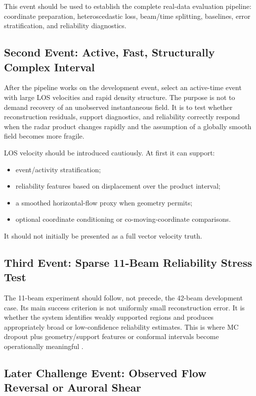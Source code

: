 \documentclass[11pt]{article}
\begin{document}
This event should be used to establish the complete real-data evaluation pipeline: coordinate preparation,
heteroscedastic loss, beam/time splitting, baselines, error stratification, and reliability diagnostics.

\subsection{Second Event: Active, Fast, Structurally Complex Interval}

After the pipeline works on the development event, select an active-time event with large LOS velocities and
rapid density structure. The purpose is not to demand recovery of an unobserved instantaneous field. It is to
test whether reconstruction residuals, support diagnostics, and reliability correctly respond when the radar
product changes rapidly and the assumption of a globally smooth field becomes more fragile.

LOS velocity should be introduced cautiously. At first it can support:
\begin{itemize}
  \item event/activity stratification;
  \item reliability features based on displacement over the product interval;
  \item a smoothed horizontal-flow proxy when geometry permits;
  \item optional coordinate conditioning or co-moving-coordinate comparisons.
\end{itemize}
It should not initially be presented as a full vector velocity truth.

\subsection{Third Event: Sparse 11-Beam Reliability Stress Test}

The 11-beam experiment should follow, not precede, the 42-beam development case. Its main success criterion
is not uniformly small reconstruction error. It is whether the system identifies weakly supported regions
and produces appropriately broad or low-confidence reliability estimates. This is where MC dropout plus
geometry/support features or conformal intervals become operationally meaningful
\cite{Gal2016Dropout,AngelopoulosBates2021,Romano2019CQR}.

\subsection{Later Challenge Event: Observed Flow Reversal or Auroral Shear}
\end{document}
